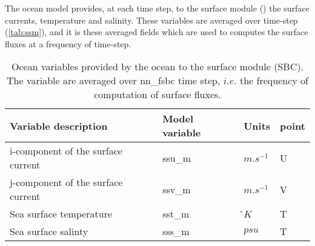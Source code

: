 \documentclass[../tex_main/NEMO_manual]{subfiles}
\begin{document}
%
%
%
%
%
%
% 
%

The ocean model provides, at each time step, to the surface module ()
the surface currents, temperature and salinity.  
These variables are averaged over  time-step (\autoref{tab:ssm}), and
it is these averaged fields which are used to computes the surface fluxes at a frequency of  time-step.


\begin{table}[tb]   \begin{center}   \begin{tabular}{|l|l|l|l|}
\hline
Variable description					& Model variable	& Units	& point \\	\hline
i-component of the surface current	& ssu\_m	& $m.s^{-1}$	& U \\	\hline
j-component of the surface current	& ssv\_m	& $m.s^{-1}$	& V \\	\hline
Sea surface temperature				& sst\_m	& \r{}$K$		& T \\	\hline
Sea surface salinty					& sss\_m	& $psu$			& T \\	\hline
\end{tabular}
\caption{  \protect\label{tab:ssm}
  Ocean variables provided by the ocean to the surface module (SBC).
  The variable are averaged over nn{\_}fsbc time step,
  $i.e.$ the frequency of computation of surface fluxes.}
\end{center}   \end{table}

\end{document}
